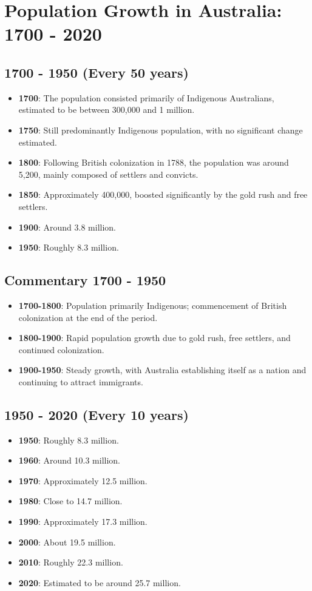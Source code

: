 \section*{Population Growth in Australia: 1700 - 2020}

\subsection*{1700 - 1950 (Every 50 years)}
\begin{itemize}
    \item \textbf{1700}: The population consisted primarily of Indigenous Australians, estimated to be between 300,000 and 1 million.
    \item \textbf{1750}: Still predominantly Indigenous population, with no significant change estimated.
    \item \textbf{1800}: Following British colonization in 1788, the population was around 5,200, mainly composed of settlers and convicts.
    \item \textbf{1850}: Approximately 400,000, boosted significantly by the gold rush and free settlers.
    \item \textbf{1900}: Around 3.8 million.
    \item \textbf{1950}: Roughly 8.3 million.
\end{itemize}

\subsection*{Commentary 1700 - 1950}
\begin{itemize}
    \item \textbf{1700-1800}: Population primarily Indigenous; commencement of British colonization at the end of the period.
    \item \textbf{1800-1900}: Rapid population growth due to gold rush, free settlers, and continued colonization.
    \item \textbf{1900-1950}: Steady growth, with Australia establishing itself as a nation and continuing to attract immigrants.
\end{itemize}

\subsection*{1950 - 2020 (Every 10 years)}
\begin{itemize}
    \item \textbf{1950}: Roughly 8.3 million.
    \item \textbf{1960}: Around 10.3 million.
    \item \textbf{1970}: Approximately 12.5 million.
    \item \textbf{1980}: Close to 14.7 million.
    \item \textbf{1990}: Approximately 17.3 million.
    \item \textbf{2000}: About 19.5 million.
    \item \textbf{2010}: Roughly 22.3 million.
    \item \textbf{2020}: Estimated to be around 25.7 million.
\end{itemize}

